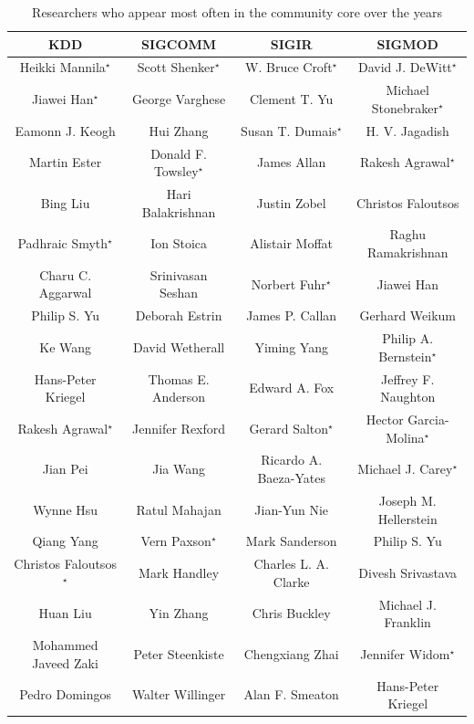\begin{table}[!htb]
\centering
\caption{Researchers who appear most often in the community core over the years}
\label{tab:authors_frequency_core_community}
{\small
\begin{tabular}{|c|c|c|c|} \hline
\bf{KDD} & \bf{SIGCOMM} & \bf{SIGIR} & \bf{SIGMOD}\\ \hline
Heikki Mannila$^\star$ & Scott Shenker$^\star$ & W. Bruce Croft$^\star$ & David J. DeWitt$^\star$\\ \hline
Jiawei Han$^\star$ & George Varghese & Clement T. Yu & Michael Stonebraker$^\star$\\ \hline
Eamonn J. Keogh & Hui Zhang & Susan T. Dumais$^\star$ & H. V. Jagadish\\ \hline
Martin Ester & Donald F. Towsley$^\star$ & James Allan & Rakesh Agrawal$^\star$\\ \hline
Bing Liu & Hari Balakrishnan & Justin Zobel & Christos Faloutsos\\ \hline
Padhraic Smyth$^\star$ & Ion Stoica & Alistair Moffat & Raghu Ramakrishnan\\ \hline
Charu C. Aggarwal & Srinivasan Seshan & Norbert Fuhr$^\star$ & Jiawei Han\\ \hline
Philip S. Yu & Deborah Estrin & James P. Callan & Gerhard Weikum\\ \hline
Ke Wang & David Wetherall & Yiming Yang & Philip A. Bernstein$^\star$\\ \hline
Hans-Peter Kriegel & Thomas E. Anderson & Edward A. Fox & Jeffrey F. Naughton\\ \hline
Rakesh Agrawal$^\star$ & Jennifer Rexford & Gerard Salton$^\star$ & Hector Garcia-Molina$^\star$\\ \hline
Jian Pei & Jia Wang & Ricardo A. Baeza-Yates & Michael J. Carey$^\star$\\ \hline
Wynne Hsu & Ratul Mahajan & Jian-Yun Nie & Joseph M. Hellerstein\\ \hline
Qiang Yang & Vern Paxson$^\star$ & Mark Sanderson & Philip S. Yu\\ \hline
Christos Faloutsos$^\star$ & Mark Handley & Charles L. A. Clarke & Divesh Srivastava\\ \hline
Huan Liu & Yin Zhang & Chris Buckley & Michael J. Franklin\\ \hline
Mohammed Javeed Zaki & Peter Steenkiste & Chengxiang Zhai & Jennifer Widom$^\star$\\ \hline
Pedro Domingos & Walter Willinger & Alan F. Smeaton & Hans-Peter Kriegel\\ \hline

\end{tabular}}
\end{table}
